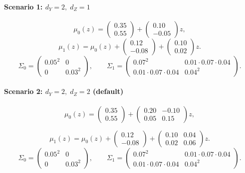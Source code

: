 \documentclass{article}
\theoremstyle{plain}
\theoremstyle{definition}
\theoremstyle{plain}
\begin{document}
\paragraph{Scenario 1: $d_Y=2,\; d_Z=1$}
\[
\mu_0(z)=
\begin{pmatrix}0.35\\0.55\end{pmatrix}
+
\begin{pmatrix}0.10\\-0.05\end{pmatrix}z,
\]
\[
\mu_1(z)=\mu_0(z)+
\begin{pmatrix}0.12\\-0.08\end{pmatrix}
+
\begin{pmatrix}0.10\\0.02\end{pmatrix}z.
\]
\[
\Sigma_0=
\begin{pmatrix}
0.05^2 & 0\\
0 & 0.03^2
\end{pmatrix},\qquad
\Sigma_1=
\begin{pmatrix}
0.07^2 & 0.01\cdot0.07\cdot0.04\\
0.01\cdot0.07\cdot0.04 & 0.04^2
\end{pmatrix}.
\]

\paragraph{Scenario 2: $d_Y=2,\; d_Z=2$ (default)}
\[
\mu_0(z)=
\begin{pmatrix}0.35\\0.55\end{pmatrix}
+
\begin{pmatrix}
0.20 & -0.10\\
0.05 & 0.15
\end{pmatrix}z,
\]

\[
\mu_1(z)=\mu_0(z)+
\begin{pmatrix}0.12\\-0.08\end{pmatrix}
+
\begin{pmatrix}
0.10 & 0.04\\
0.02 & 0.06
\end{pmatrix}z.
\]
\[
\Sigma_0=
\begin{pmatrix}
0.05^2 & 0\\
0 & 0.03^2
\end{pmatrix},\qquad
\Sigma_1=
\begin{pmatrix}
0.07^2 & 0.01\cdot0.07\cdot0.04\\
0.01\cdot0.07\cdot0.04 & 0.04^2
\end{pmatrix}.
\]
\end{document}

